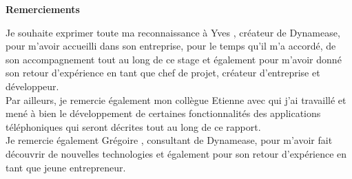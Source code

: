 \begin{center}
        \Huge{\bf Remerciements}\\[1.5cm]
\end{center}

Je souhaite exprimer toute ma reconnaissance à Yves , créateur de Dynamease, pour m’avoir accueilli dans son entreprise, pour le temps qu’il m’a accordé, de son accompagnement tout au long de ce stage et également pour m'avoir donné son retour d'expérience en tant que chef de projet, créateur d'entreprise et développeur.\\

Par ailleurs, je remercie également mon collègue Etienne  avec qui j’ai travaillé et mené à bien le développement de certaines fonctionnalités des applications téléphoniques qui seront décrites tout au long de ce rapport.\\

Je remercie également Grégoire , consultant de Dynamease, pour m'avoir fait découvrir de nouvelles technologies et également pour son retour d'expérience en tant que jeune entrepreneur. 